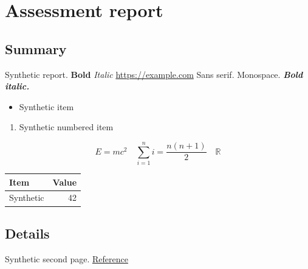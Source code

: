 \documentclass{report}
\begin{document}
\tableofcontents
\chapter{Assessment report}
\section{Summary}
Synthetic report. \textbf{Bold} \textit{Italic} \url{https://example.com}
{\sffamily Sans serif.} {\ttfamily Monospace.} \textbf{\textit{Bold italic.}}
\begin{itemize}\item Synthetic item\end{itemize}
\begin{enumerate}\item Synthetic numbered item\end{enumerate}
\begin{equation} E=mc^2 \quad \sum_{i=1}^{n} i=\frac{n(n+1)}2 \quad \mathbb{R} \end{equation}
\begin{longtable}{lr}
\toprule Item & Value\\\midrule
Synthetic & 42\\\bottomrule
\end{longtable}
\newpage
\section{Details} Synthetic second page. \href{https://example.com}{Reference}
\end{document}
